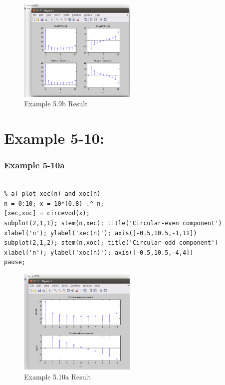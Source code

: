 \documentclass[11pt
  , a4paper
  , article
  , oneside
]{memoir}
\begin{document}
\begin{figure}[h!]
	\centering
	\includegraphics[width=0.5\textwidth,height=0.4\textwidth]{./images/ex509b.png}
	\caption{Example 5.9b Result}
	\label{fig:Example 5.9b Result}
\end{figure}

\chapter{Example 5-10:}
\subsection{Example 5-10a}
\begin{lstlisting}[style=termstyle]
% Example 5-10

% a) plot xec(n) and xoc(n)
n = 0:10; x = 10*(0.8) .^ n;
[xec,xoc] = circevod(x);
subplot(2,1,1); stem(n,xec); title('Circular-even component')
xlabel('n'); ylabel('xec(n)'); axis([-0.5,10.5,-1,11])
subplot(2,1,2); stem(n,xoc); title('Circular-odd component')
xlabel('n'); ylabel('xoc(n)'); axis([-0.5,10.5,-4,4])
pause;
\end{lstlisting}

\begin{figure}[h!]
	\centering
	\includegraphics[width=0.5\textwidth,height=0.4\textwidth]{./images/ex510a.png}
	\caption{Example 5.10a Result}
	\label{fig:Example 5.10a Result}
\end{figure}
\end{document}

